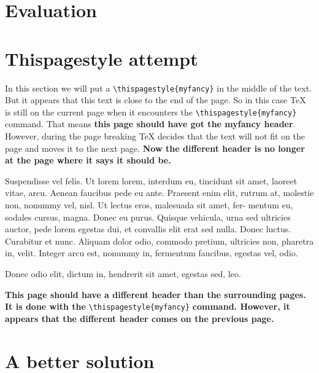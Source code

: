 \documentclass[openany]{book}
\begin{document}
\lipsum[2-3]

\section{Evaluation}

\lipsum[3-5]

\newpage

\section{Thispagestyle attempt}

In this section we will put a \verb|\thispagestyle{myfancy}| in the middle of the text. But it appears that this text is close to the end of the page. So in this case \TeX{} is still on the current page when it encounters the \verb|\thispagestyle{myfancy}| command. That means \textbf{this page should have got the myfancy header}. However, during the page breaking \TeX{} decides that the text will not fit on the page and moves it to the next page. \textbf{Now the different header is no longer at the page where it says it should be.}

\bigskip

\lipsum[6-8]

\bigskip
Suspendisse vel felis. Ut lorem lorem, interdum eu, tincidunt sit amet, laoreet vitae, arcu. Aenean faucibus pede eu ante. Praesent enim elit, rutrum at, molestie non, nonummy vel, nisl. Ut lectus eros, malesuada sit amet, fer- mentum eu, sodales cursus, magna. Donec eu purus. Quisque vehicula, urna sed ultricies auctor, pede lorem egestas dui, et convallis elit erat sed nulla. Donec luctus. Curabitur et nunc. Aliquam dolor odio, commodo pretium, ultricies non, pharetra in, velit. Integer arcu est, nonummy in, fermentum faucibus, egestas vel, odio.

\bigskip

Donec odio elit, dictum in, hendrerit sit amet, egestas sed, leo.

\textbf{This page should have a different header than the surrounding pages. 
\thispagestyle{myfancy}
It is done with the} \verb|\thispagestyle{myfancy}| \textbf{command.
However, it appears that the different header comes on the previous page.}

\bigskip

\lipsum[8-9]

\newpage

\section{A better solution}
\end{document}
